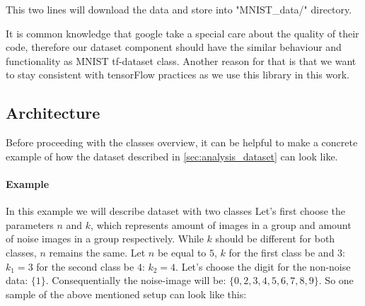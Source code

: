 This two lines will download the data and store into "MNIST_data/" directory.

It is common knowledge that google take a special care about the quality of their code,
therefore our dataset component should have the similar
behaviour and functionality as MNIST tf-dataset class. Another reason for that
is that we want to stay consistent with tensorFlow practices as we use this library
in this work.





\subsection{Architecture}

Before proceeding with the classes overview, it can be helpful
to make a concrete example of how the dataset described in
\autoref{sec:analysis_dataset} can look like.

\paragraph{Example} In this example we will describe dataset with two classes
Let's first choose the parameters $n$ and $k$,
which represents amount of images in a group and amount of noise images
in a group respectively. While $k$
should be different for both classes, $n$ remains the same.
Let $n$ be equal to $5$, $k$ for the first class be and $3$: $k_1 = 3$
for the second class be $4$: $k_2 = 4$. Let's choose the digit for the non-noise
data: $\{1\}$. Consequentially the noise-image will
be: $\{0, 2, 3, 4, 5, 6, 7, 8, 9\}$.
So one sample of the above mentioned setup can look like this:

